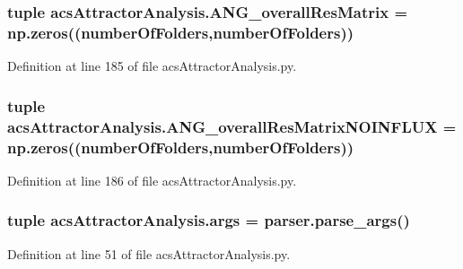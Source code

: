 \hypertarget{a00124_a43a783e7bdb1094aa477c438bd67259f}{
\subsubsection[{A\+N\+G\+\_\+overall\+Res\+Matrix}]{\setlength{\rightskip}{0pt plus 5cm}tuple acs\+Attractor\+Analysis.\+A\+N\+G\+\_\+overall\+Res\+Matrix = np.\+zeros(({\bf number\+Of\+Folders},{\bf number\+Of\+Folders}))}}\label{a00124_a43a783e7bdb1094aa477c438bd67259f}


Definition at line 185 of file acs\+Attractor\+Analysis.\+py.

\hypertarget{a00124_a0d0e0ed8583e4aa041fa6c122324311e}{
\subsubsection[{A\+N\+G\+\_\+overall\+Res\+Matrix\+N\+O\+I\+N\+F\+L\+U\+X}]{\setlength{\rightskip}{0pt plus 5cm}tuple acs\+Attractor\+Analysis.\+A\+N\+G\+\_\+overall\+Res\+Matrix\+N\+O\+I\+N\+F\+L\+U\+X = np.\+zeros(({\bf number\+Of\+Folders},{\bf number\+Of\+Folders}))}}\label{a00124_a0d0e0ed8583e4aa041fa6c122324311e}


Definition at line 186 of file acs\+Attractor\+Analysis.\+py.

\hypertarget{a00124_a750e66218ca39f0949f2f92e89136e37}{
\subsubsection[{args}]{\setlength{\rightskip}{0pt plus 5cm}tuple acs\+Attractor\+Analysis.\+args = parser.\+parse\+\_\+args()}}\label{a00124_a750e66218ca39f0949f2f92e89136e37}


Definition at line 51 of file acs\+Attractor\+Analysis.\+py.

